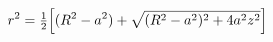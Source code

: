 \documentclass[preview]{standalone}
\begin{document}
\begin{align*}
\special{dvisvgm:raw <g id='unique000'>}r^2 = \tfrac12\Big[(R^2-a^2)+\sqrt{(R^2-a^2)^2+4a^2z^2}\Big]\special{dvisvgm:raw </g>}
\end{align*}
\end{document}
